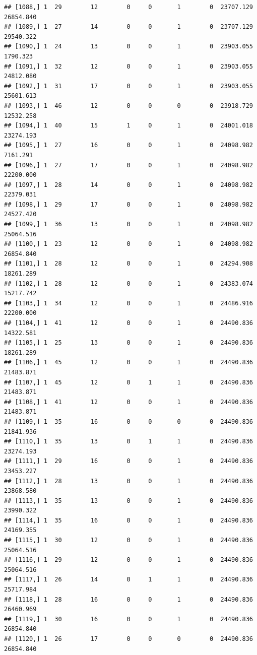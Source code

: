 \documentclass[
]{article}
\begin{document}
\begin{verbatim}
## [1088,] 1  29        12        0     0       1        0  23707.129  26854.840
## [1089,] 1  27        14        0     0       1        0  23707.129  29540.322
## [1090,] 1  24        13        0     0       1        0  23903.055   1790.323
## [1091,] 1  32        12        0     0       1        0  23903.055  24812.080
## [1092,] 1  31        17        0     0       1        0  23903.055  25601.613
## [1093,] 1  46        12        0     0       0        0  23918.729  12532.258
## [1094,] 1  40        15        1     0       1        0  24001.018  23274.193
## [1095,] 1  27        16        0     0       1        0  24098.982   7161.291
## [1096,] 1  27        17        0     0       1        0  24098.982  22200.000
## [1097,] 1  28        14        0     0       1        0  24098.982  22379.031
## [1098,] 1  29        17        0     0       1        0  24098.982  24527.420
## [1099,] 1  36        13        0     0       1        0  24098.982  25064.516
## [1100,] 1  23        12        0     0       1        0  24098.982  26854.840
## [1101,] 1  28        12        0     0       1        0  24294.908  18261.289
## [1102,] 1  28        12        0     0       1        0  24383.074  15217.742
## [1103,] 1  34        12        0     0       1        0  24486.916  22200.000
## [1104,] 1  41        12        0     0       1        0  24490.836  14322.581
## [1105,] 1  25        13        0     0       1        0  24490.836  18261.289
## [1106,] 1  45        12        0     0       1        0  24490.836  21483.871
## [1107,] 1  45        12        0     1       1        0  24490.836  21483.871
## [1108,] 1  41        12        0     0       1        0  24490.836  21483.871
## [1109,] 1  35        16        0     0       0        0  24490.836  21841.936
## [1110,] 1  35        13        0     1       1        0  24490.836  23274.193
## [1111,] 1  29        16        0     0       1        0  24490.836  23453.227
## [1112,] 1  28        13        0     0       1        0  24490.836  23868.580
## [1113,] 1  35        13        0     0       1        0  24490.836  23990.322
## [1114,] 1  35        16        0     0       1        0  24490.836  24169.355
## [1115,] 1  30        12        0     0       1        0  24490.836  25064.516
## [1116,] 1  29        12        0     0       1        0  24490.836  25064.516
## [1117,] 1  26        14        0     1       1        0  24490.836  25717.984
## [1118,] 1  28        16        0     0       1        0  24490.836  26460.969
## [1119,] 1  30        16        0     0       1        0  24490.836  26854.840
## [1120,] 1  26        17        0     0       0        0  24490.836  26854.840

\end{verbatim}
\end{document}
